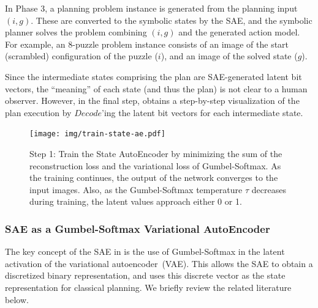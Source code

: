 In Phase 3, a planning problem instance is generated from the planning input $(i,g)$.
These are converted to the symbolic states by the SAE, and the symbolic planner solves the problem
combining $(i,g)$ and the generated action model.
For example, an 8-puzzle problem instance consists of an image of the start (scrambled) configuration of the puzzle ($i$), and an image of the solved state ($g$).

Since the intermediate states comprising the plan are SAE-generated latent bit vectors, the ``meaning'' of each state (and thus the plan) is not clear to a human observer.
However, in the final step, \latentplanner obtains a step-by-step visualization of the plan execution
by $Decode$'ing the latent bit vectors for each intermediate state.

\begin{figure}[tb]
 \texttt{[image: img/train-state-ae.pdf]}
 \caption{Step 1:
Train the State AutoEncoder by
 minimizing the sum of the reconstruction loss and the variational loss of Gumbel-Softmax.
As the training continues, the output of the network converges to the input images.
Also, as the Gumbel-Softmax temperature $\tau$ decreases during training,
the latent values approach either 0 or 1.}
 \label{sae}
\end{figure}

\subsubsection{SAE as a Gumbel-Softmax Variational AutoEncoder}

The key concept of the SAE in \latentplanner is the use of Gumbel-Softmax \cite{jang2016categorical}
in the latent activation of the variational autoencoder~(VAE).
This allows the SAE to obtain a discretized binary representation, and \latentplanner uses this
discrete vector as the state representation for classical planning.
We briefly review the related literature below.

